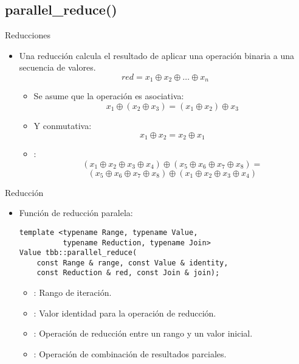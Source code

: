 \subsection{parallel\_reduce()}

\begin{frame}[t,fragile]{Reducciones}
\begin{itemize}
  \item Una reducción calcula el resultado de aplicar una
        operación binaria a una secuencia de valores.
\[
red = x_1 \oplus x_2 \oplus \ldots \oplus x_n
\]

    \begin{itemize}
      \item Se asume que la operación es asociativa:
\[
x_1 \oplus (x_2 \oplus x_3) = (x_1 \oplus x_2) \oplus x_3
\]
      \item Y conmutativa:
\[
x_1 \oplus x_2 = x_2 \oplus x_1
\]

      \item {}:
\[ (x_1 \oplus x_2 \oplus x_3 \oplus x_4) \oplus (x_5 \oplus x_6 \oplus x_7 \oplus x_8) = \]
\[ (x_5 \oplus x_6 \oplus x_7 \oplus x_8) \oplus (x_1 \oplus x_2 \oplus x_3 \oplus x_4) \]

    \end{itemize}

\end{itemize}
\end{frame}

\begin{frame}[t,fragile]{Reducción}
\begin{itemize}
  \item Función de reducción paralela:
\begin{lstlisting}
template <typename Range, typename Value, 
          typename Reduction, typename Join>
Value tbb::parallel_reduce(
    const Range & range, const Value & identity, 
    const Reduction & red, const Join & join);
\end{lstlisting}

  \begin{itemize}
    \item {}: Rango de iteración.
    \item {}: Valor identidad para la operación de reducción.
    \item {}: Operación de reducción entre un rango y un valor inicial.
    \item {}: Operación de combinación de resultados parciales.
  \end{itemize}
\end{itemize}
\end{frame}

